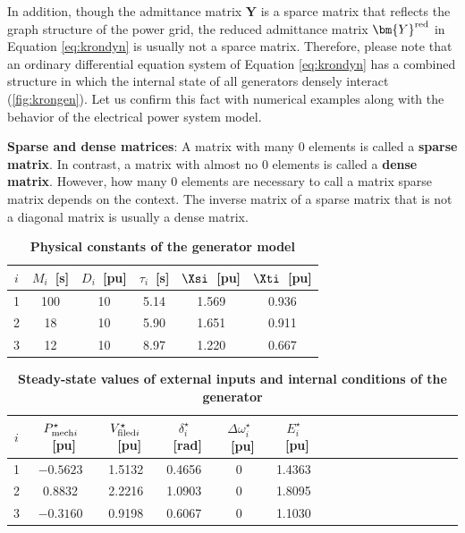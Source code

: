 \documentclass[graybox, envcountchap]{svmult}
\begin{document}
In addition, though the admittance matrix $\bm{Y}$ is a sparce matrix that reflects the graph structure of the power grid, the reduced admittance matrix $\bm{Y}^{\rm red}$ in Equation \ref{eq:krondyn} is usually not a sparce matrix.
Therefore, please note that an ordinary differential equation system of Equation \ref{eq:krondyn} has a combined structure in which the internal state of all generators densely interact (\ref{fig:krongen}).
Let us confirm this fact with numerical examples along with the behavior of the electrical power system model. 

\begin{COLUMN}
\noindent \textbf{Sparse and dense matrices}:
A matrix with many 0 elements is called a \textbf{sparse matrix}.
In contrast, a matrix with almost no 0 elements is called a \textbf{dense matrix}.
However, how many 0 elements are necessary to call a matrix sparse matrix depends on the context.
The inverse matrix of a sparse matrix that is not a diagonal matrix is usually a dense matrix.
\end{COLUMN}


\begin{table}[h]
\medskip
 \caption{\textbf{Physical constants of the generator model}}
 \label{table:genparams}
 \centering
  \begin{tabular}{cccccc}
   \hline
$i$ &  $M_i$~[s] & $D_i$~[pu] & $\tau_i$~[s] & $\Xsi$~[pu] & $\Xti$~[pu] \\
   \hline \hline
1 & 100 & 10 & 5.14 & 1.569 & 0.936 \\
   \hline
2 & 18 & 10 & 5.90 & 1.651 & 0.911 \\
   \hline
3 & 12 & 10 & 8.97 & 1.220 & 0.667 \\
   \hline
  \end{tabular}
\end{table}

\begin{table}[h]
\medskip
 \caption{\textbf{Steady-state values of external inputs and internal conditions of the generator}}
 \label{table:gensteady}
 \centering
  \begin{tabular}{ccccccccccccccccc}
   \hline
$i$ &  $P_{{\rm mech}i}^{\star}$~[pu] & $V_{{\rm filed}i}^{\star}$~[pu] & $\delta_i^{\star}$~[rad] & $\Delta \omega_i^{\star}$~[pu] & $E_i^{\star}$~[pu] \\
   \hline \hline
1 & $-0.5623$ & 1.5132 & 0.4656 & 0 & 1.4363 \\
2 & 0.8832 & 2.2216 & 1.0903 & 0 & 1.8095 \\
3 & $-0.3160$ & 0.9198 & 0.6067 & 0 & 1.1030 \\
   \hline
  \end{tabular}
\end{table}
\end{document}
